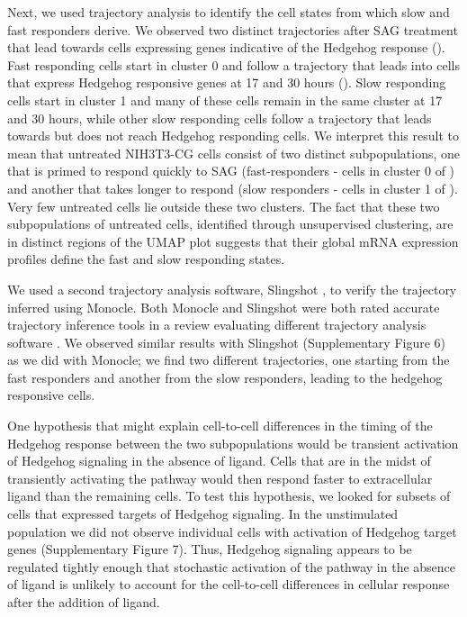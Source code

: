 Next, we used trajectory analysis \cite{Qiu2017-uz,Trapnell2014-ho} to identify the cell states from which slow and fast responders derive. We observed two distinct trajectories after SAG treatment that lead towards cells expressing genes indicative of the Hedgehog response (). Fast responding cells start in cluster 0 and follow a trajectory that leads into cells that express Hedgehog responsive genes at 17 and 30 hours (). Slow responding cells start in cluster 1 and many of these cells remain in the same cluster at 17 and 30 hours, while other slow responding cells follow a trajectory that leads towards but does not reach Hedgehog responding cells. We interpret this result to mean that untreated NIH3T3-CG cells consist of two distinct subpopulations, one that is primed to respond quickly to SAG (fast-responders - cells in cluster 0 of ) and another that takes longer to respond (slow responders - cells in cluster 1 of ). Very few untreated cells lie outside these two clusters. The fact that these two subpopulations of untreated cells, identified through unsupervised clustering, are in distinct regions of the UMAP plot suggests that their global mRNA expression profiles define the fast and slow responding states.

We used a second trajectory analysis software, Slingshot \cite{Street2018-ak}, to verify the trajectory inferred using Monocle. Both Monocle and Slingshot were both rated accurate trajectory inference tools in a review evaluating different trajectory analysis software \cite{Saelens2019-fq}. We observed similar results with Slingshot (Supplementary Figure 6) as we did with Monocle; we find two different trajectories, one starting from the fast responders and another from the slow responders, leading to the hedgehog responsive cells.

One hypothesis that might explain cell-to-cell differences in the timing of the Hedgehog response between the two subpopulations would be transient activation of Hedgehog signaling in the absence of ligand. Cells that are in the midst of transiently activating the pathway would then respond faster to extracellular ligand than the remaining cells. To test this hypothesis, we looked for subsets of cells that expressed targets of Hedgehog signaling. In the unstimulated population we did not observe individual cells with activation of Hedgehog target genes (Supplementary Figure 7). Thus, Hedgehog signaling appears to be regulated tightly enough that stochastic activation of the pathway in the absence of ligand is unlikely to account for the cell-to-cell differences in cellular response after the addition of ligand.

